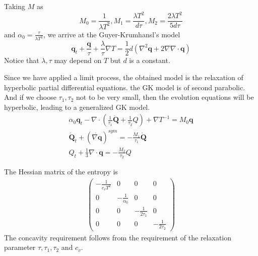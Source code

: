 \documentclass[a4paper]{article}
\begin{document}
Taking $M$ as
\begin{equation}
M_0=\frac{1}{\lambda T^2}, M_1=\frac{\lambda T^2}{d\tau}, M_2=\frac{2\lambda T^2}{5d\tau}
\end{equation}
and $\alpha_0=\frac{\tau}{\lambda T^2}$,
we arrive at the Guyer-Krumhansl's model \cite{Jou1996extended}
\begin{equation}
\mathbf{q}_t+\frac{\mathbf{q}}{\tau}+\frac{\lambda}{\tau}\nabla T=\frac{1}{2}d(\nabla^2 \mathbf{q}+2\nabla \nabla \cdot \mathbf{q})
\end{equation}
Notice that $\lambda, \tau$ may depend on $T$ but $d$ is a constant.

Since we have applied a limit process, the obtained model is the relaxation of hyperbolic partial differential equations. the GK model is of second parabolic. And if we choose $\tau_1,\tau_2$ not to be very small, then the evolution equations will be hyperbolic, leading to a generalized GK model.
\begin{eqnarray}
\alpha_0 \mathbf{q}_t - \nabla \cdot ({\frac{1}{\tau_1} \mathring{\mathbf{Q}}}+\frac{1}{\tau_2}Q)+\nabla T^{-1} = M_0 \mathbf{q} \\
\mathring{\mathbf{Q}}_t+(\mathring{\nabla \mathbf{q}})^{sym}=-\frac{M_1}{\tau_1}\mathring{\mathbf{Q}} \\
Q_t+\frac{1}{3} \nabla \cdot \mathbf{q}=-\frac{M_2}{\tau_2}Q
\end{eqnarray}

The Hessian matrix of the entropy is 
\begin{eqnarray}
\left(\begin{array}{llll}  -\frac{1}{c_v T^2} & 0 & 0 & 0 \\
                                           0  & -\frac{1}{\alpha_0} & 0 & 0 \\
										   0 & 0 & -\frac{1}{2\tau_1} & 0 \\
										   0 & 0 & 0 & -\frac{1}{2\tau_2}
										   \end{array} \right)
\end{eqnarray}
The concavity requirement follows from the requirement of the relaxation parameter $\tau,\tau_1,\tau_2$ and $c_v$.
\end{document}
